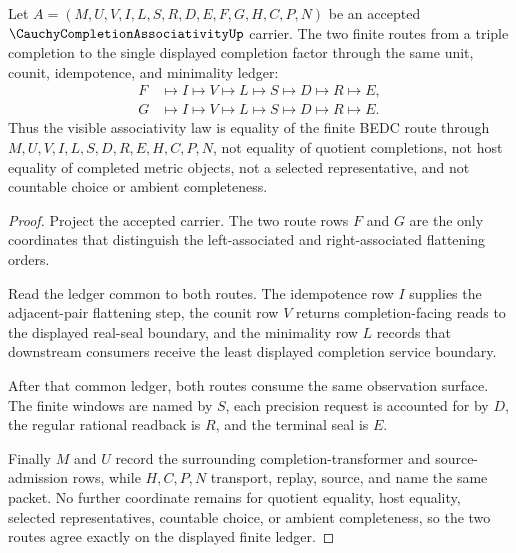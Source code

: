 
\begin{theorem}
\label{thm:cauchy-completion-associativity-flattening-route}
Let $A=(M,U,V,I,L,S,R,D,E,F,G,H,C,P,N)$ be an accepted $\CauchyCompletionAssociativityUp$ carrier. The two finite routes from a triple completion to the single displayed completion factor through the same unit, counit, idempotence, and minimality ledger:
$$
\begin{aligned}
F&\longmapsto I\longmapsto V\longmapsto L\longmapsto S\longmapsto D\longmapsto R\longmapsto E,\\
G&\longmapsto I\longmapsto V\longmapsto L\longmapsto S\longmapsto D\longmapsto R\longmapsto E .
\end{aligned}
$$
Thus the visible associativity law is equality of the finite BEDC route through $M,U,V,I,L,S,D,R,E,H,C,P,N$, not equality of quotient completions, not host equality of completed metric objects, not a selected representative, and not countable choice or ambient completeness.
\end{theorem}
\begin{proof}
Project the accepted carrier. The two route rows $F$ and $G$ are the only coordinates that distinguish the left-associated and right-associated flattening orders.

Read the ledger common to both routes. The idempotence row $I$ supplies the adjacent-pair flattening step, the counit row $V$ returns completion-facing reads to the displayed real-seal boundary, and the minimality row $L$ records that downstream consumers receive the least displayed completion service boundary.

After that common ledger, both routes consume the same observation surface. The finite windows are named by $S$, each precision request is accounted for by $D$, the regular rational readback is $R$, and the terminal seal is $E$.

Finally $M$ and $U$ record the surrounding completion-transformer and source-admission rows, while $H,C,P,N$ transport, replay, source, and name the same packet. No further coordinate remains for quotient equality, host equality, selected representatives, countable choice, or ambient completeness, so the two routes agree exactly on the displayed finite ledger.
\end{proof}

